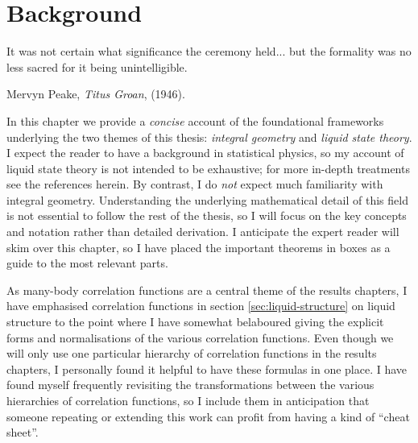 \documentclass[11pt,twoside]{report}
\def\includebibliography{}
\begin{document}
\chapter{Background}
\epigraph{It was not certain what significance the ceremony held... but the formality was no less sacred for it being unintelligible.}{Mervyn Peake, \emph{Titus Groan}, (1946).}

In this chapter we provide a \emph{concise} account of the foundational frameworks underlying the two themes of this thesis: \emph{integral geometry} and \emph{liquid state theory}.
I expect the reader to have a background in statistical physics, so my account of liquid state theory is not intended to be exhaustive; for more in-depth treatments see the references herein.
By contrast, I do \emph{not} expect much familiarity with integral geometry.
Understanding the underlying mathematical detail of this field is not essential to follow the rest of the thesis, so I will focus on the key concepts and notation rather than detailed derivation.
I anticipate the expert reader will skim over this chapter, so I have placed the important theorems in boxes as a guide to the most relevant parts.

As many-body correlation functions are a central theme of the results chapters, I have emphasised correlation functions in section \ref{sec:liquid-structure} on liquid structure to the point where I have somewhat belaboured giving the explicit forms and normalisations of the various correlation functions.
Even though we will only use one particular hierarchy of correlation functions in the results chapters, I personally found it helpful to have these formulas in one place.
I have found myself frequently revisiting the transformations between the various hierarchies of correlation functions, so I include them in anticipation that someone repeating or extending this work can profit from having a kind of ``cheat sheet''.






\ifdefined\includebibliography
  \printbibliography
\fi
\end{document}
